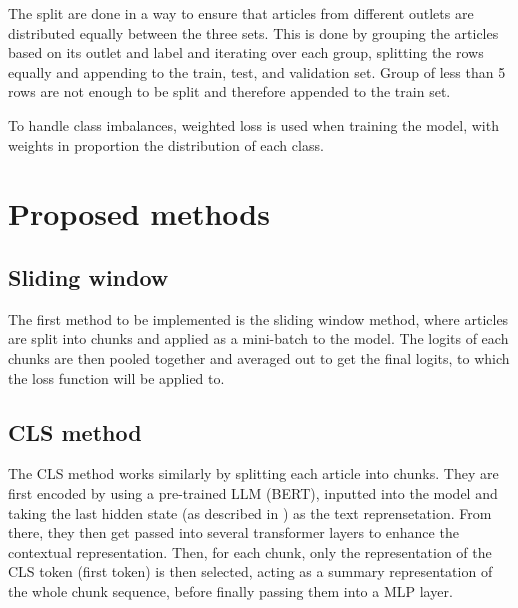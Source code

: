 The split are done in a way to ensure that articles from different outlets are distributed equally between the three sets. This is done by grouping the articles based on its outlet and label and iterating over each group, splitting the rows equally and appending to the train, test, and validation set. Group of less than 5 rows are not enough to be split and therefore appended to the train set.

To handle class imbalances, weighted loss is used when training the model, with weights in proportion the distribution of each class.

\section{Proposed methods}

\subsection{Sliding window}

The first method to be implemented is the sliding window method, where articles are split into chunks and applied as a mini-batch to the model. The logits of each chunks are then pooled together and averaged out to get the final logits, to which the loss function will be applied to.

\subsection{CLS method}

The CLS method works similarly by splitting each article into chunks. They are first encoded by using a pre-trained LLM (BERT), inputted into the model and taking the last hidden state (as described in \cite{sun-2020-finetune}) as the text reprensetation. From there, they then get passed into several transformer layers to enhance the contextual representation. Then, for each chunk, only the representation of the CLS token (first token) is then selected, acting as a summary representation of the whole chunk sequence, before finally passing them into a MLP layer.


